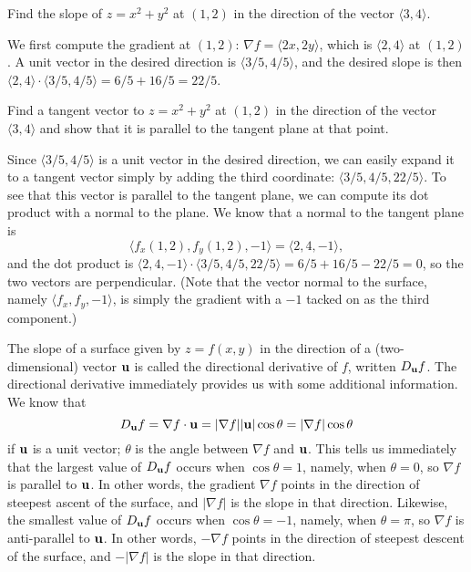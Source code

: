 \begin{example} Find the slope of $z=x^2+y^2$ at $(1,2)$ in the direction of the
vector $\langle 3,4\rangle$. 

We first compute the gradient at $(1,2)$:
$\nabla f=\langle 2x,2y\rangle$, which is $\langle 2,4\rangle$ at
$(1,2)$. A unit vector in the desired direction is $\langle
3/5,4/5\rangle$, and the desired slope is then
$\langle 2,4\rangle\cdot\langle 3/5,4/5\rangle=6/5+16/5=22/5$.
\end{example}

\begin{example} Find a tangent vector to $z=x^2+y^2$ at $(1,2)$ in the direction of the
vector $\langle 3,4\rangle$ and show that it is parallel to the
tangent plane at that point.

Since $\langle 3/5,4/5\rangle$ is a unit vector in the desired
direction, we can easily expand it to a tangent vector simply by
adding the third coordinate: $\langle 3/5,4/5,22/5\rangle$.
To see that this vector is parallel to the tangent plane, we 
can compute its dot product with a normal to the plane. We know that a
normal to the tangent plane is
$$\langle f_x(1,2),f_y(1,2),-1\rangle = \langle 2,4,-1\rangle,$$
and the dot product is $\langle 2,4,-1\rangle\cdot\langle
3/5,4/5,22/5\rangle=6/5+16/5-22/5=0$, so the two vectors are
perpendicular. (Note that the vector normal to the surface, namely 
$\langle f_x,f_y,-1\rangle$, is simply the gradient with a $-1$ tacked
on as the third component.)
\end{example}

The slope of a surface given by $z=f(x,y)$ in the direction of a
(two-dimensional) vector $\bf u$ is called the {\dfont directional
  derivative\/} of $f$, written $D_{\bf u}f$.
The directional derivative immediately provides us with some
additional information. We know that 
$$D_{\bf u}f=\nabla f\cdot {\bf u}=|\nabla f||{\bf u}|\cos\theta=
|\nabla f|\cos\theta$$
if $\bf u$ is a unit vector; $\theta$ is the angle between $\nabla f$
and $\bf u$. This tells us immediately that the largest value of
$D_{\bf u}f$ occurs when $\cos\theta=1$, namely, when $\theta=0$, so 
$\nabla f$ is parallel to $\bf u$. In other words, the gradient
$\nabla f$ points in the direction of steepest ascent of the surface, and 
$|\nabla f|$ is the slope in that direction. Likewise, the smallest value of
$D_{\bf u}f$ occurs when $\cos\theta=-1$, namely, when $\theta=\pi$, so 
$\nabla f$ is anti-parallel to $\bf u$. In other words, 
$-\nabla f$ points in the direction of steepest descent of the surface, and 
$-|\nabla f|$ is the slope in that direction.

